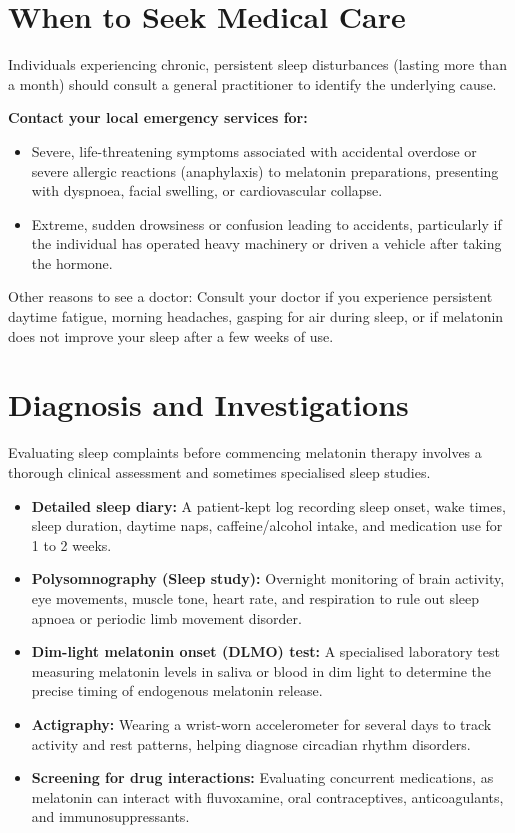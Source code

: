 \section*{When to Seek Medical Care}
Individuals experiencing chronic, persistent sleep disturbances (lasting more than a month) should consult a general practitioner to identify the underlying cause.

\textbf{Contact your local emergency services for:}
\begin{itemize}
    \item Severe, life-threatening symptoms associated with accidental overdose or severe allergic reactions (anaphylaxis) to melatonin preparations, presenting with dyspnoea, facial swelling, or cardiovascular collapse.
    \item Extreme, sudden drowsiness or confusion leading to accidents, particularly if the individual has operated heavy machinery or driven a vehicle after taking the hormone.
\end{itemize}
Other reasons to see a doctor: Consult your doctor if you experience persistent daytime fatigue, morning headaches, gasping for air during sleep, or if melatonin does not improve your sleep after a few weeks of use.

\section*{Diagnosis and Investigations}
Evaluating sleep complaints before commencing melatonin therapy involves a thorough clinical assessment and sometimes specialised sleep studies.
\begin{itemize}
    \item \textbf{Detailed sleep diary:} A patient-kept log recording sleep onset, wake times, sleep duration, daytime naps, caffeine/alcohol intake, and medication use for 1 to 2 weeks.
    \item \textbf{Polysomnography (Sleep study):} Overnight monitoring of brain activity, eye movements, muscle tone, heart rate, and respiration to rule out sleep apnoea or periodic limb movement disorder.
    \item \textbf{Dim-light melatonin onset (DLMO) test:} A specialised laboratory test measuring melatonin levels in saliva or blood in dim light to determine the precise timing of endogenous melatonin release.
    \item \textbf{Actigraphy:} Wearing a wrist-worn accelerometer for several days to track activity and rest patterns, helping diagnose circadian rhythm disorders.
    \item \textbf{Screening for drug interactions:} Evaluating concurrent medications, as melatonin can interact with fluvoxamine, oral contraceptives, anticoagulants, and immunosuppressants.
\end{itemize}

